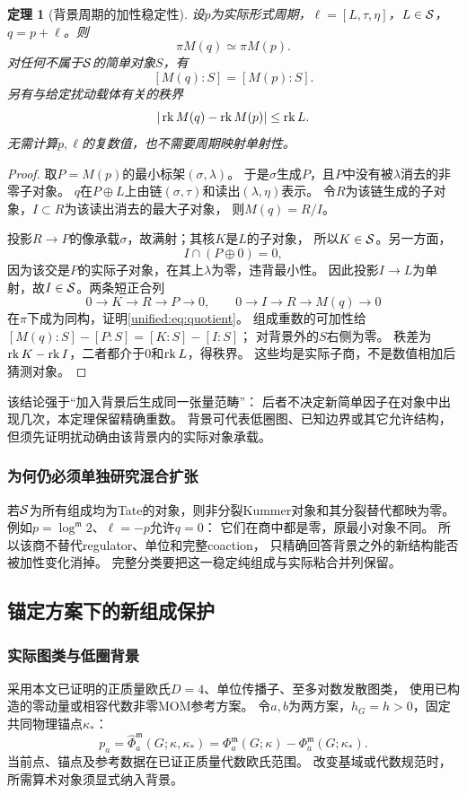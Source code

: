 \documentclass[11pt,a4paper,oneside]{ctexart}
\theoremstyle{cnplain}
\newtheorem{theorem}{定理}[section]
\theoremstyle{definition}
\theoremstyle{remark}
\numberwithin{equation}{section}
\begin{document}
\begin{theorem}[背景周期的加性稳定性]\label{unified:thm:addition}
设$p$为实际形式周期，$\ell=[L,\tau,\eta]$，$L\in\mathcal S$，
$q=p+\ell$。则
\begin{equation}\label{unified:eq:quotient}
 \pi M(q)\simeq\pi M(p).
\end{equation}
对任何不属于$\mathcal S$的简单对象$S$，有
\[
 [M(q):S]=[M(p):S].
\]
另有与给定扰动载体有关的秩界
\[
 |\operatorname{rk} M(q)-\operatorname{rk} M(p)|\leq\operatorname{rk} L .
\]
无需计算$p,\ell$的复数值，也不需要周期映射单射性。
\end{theorem}
\begin{proof}
取$P=M(p)$的最小标架$(\sigma,\lambda)$。
于是$\sigma$生成$P$，且$P$中没有被$\lambda$消去的非零子对象。
$q$在$P\oplus L$上由链$(\sigma,\tau)$和读出$(\lambda,\eta)$表示。
令$R$为该链生成的子对象，$I\subset R$为该读出消去的最大子对象，
则$M(q)=R/I$。

投影$R\to P$的像承载$\sigma$，故满射；其核$K$是$L$的子对象，
所以$K\in\mathcal S$。另一方面，
\[
 I\cap(P\oplus0)=0,
\]
因为该交是$P$的实际子对象，在其上$\lambda$为零，违背最小性。
因此投影$I\to L$为单射，故$I\in\mathcal S$。两条短正合列
\[
 0\to K\to R\to P\to0,\qquad
 0\to I\to R\to M(q)\to0
\]
在$\pi$下成为同构，证明\eqref{unified:eq:quotient}。
组成重数的可加性给
$[M(q):S]-[P:S]=[K:S]-[I:S]$；
对背景外的$S$右侧为零。
秩差为$\operatorname{rk} K-\operatorname{rk} I$，二者都介于$0$和$\operatorname{rk} L$，得秩界。
这些均是实际子商，不是数值相加后猜测对象。
\end{proof}

该结论强于“加入背景后生成同一张量范畴”：
后者不决定新简单因子在对象中出现几次，本定理保留精确重数。
背景可代表低圈图、已知边界或其它允许结构，
但须先证明扰动确由该背景内的实际对象承载。

\subsubsection{为何仍必须单独研究混合扩张}
若$\mathcal S$为所有组成均为Tate的对象，则非分裂Kummer对象和其分裂替代都映为零。
例如$p=\log^{\mathfrak m}2$、$\ell=-p$允许$q=0$：
它们在商中都是零，原最小对象不同。
所以该商不替代regulator、单位和完整coaction，
只精确回答背景之外的新结构能否被加性变化消掉。
完整分类要把这一稳定纯组成与实际粘合并列保留。


\subsection{锚定方案下的新组成保护}
\subsubsection{实际图类与低圈背景}
采用本文已证明的正质量欧氏$D=4$、单位传播子、至多对数发散图类，
使用已构造的零动量或相容代数非零MOM参考方案。
令$a,b$为两方案，$h_G=h>0$，固定共同物理锚点$\kappa_*$：
\[
 p_a=\widehat\Phi_a^{\mathfrak m}(G;\kappa,\kappa_*)
 =\Phi_a^{\mathfrak m}(G;\kappa)-\Phi_a^{\mathfrak m}(G;\kappa_*).
\]
当前点、锚点及参考数据在已证正质量代数欧氏范围。
改变基域或代数规范时，所需算术对象须显式纳入背景。
\end{document}
